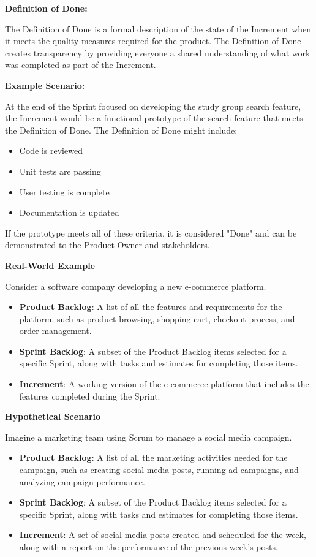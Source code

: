 \textbf{Definition of Done:}

The Definition of Done is a formal description of the state of the Increment
when it meets the quality measures required for the product. The Definition of
Done creates transparency by providing everyone a shared understanding of what
work was completed as part of the Increment.

\textbf{Example Scenario:}

At the end of the Sprint focused on developing the study group search feature,
the Increment would be a functional prototype of the search feature that meets
the Definition of Done. The Definition of Done might include:

\begin{itemize}
  \item Code is reviewed
  \item Unit tests are passing
  \item User testing is complete
  \item Documentation is updated
\end{itemize}

If the prototype meets all of these criteria, it is considered "Done" and can
be demonstrated to the Product Owner and stakeholders.

\textbf{Real-World Example}

Consider a software company developing a new e-commerce platform.

\begin{itemize}
  \item \textbf{Product Backlog}: A list of all the features and requirements for the platform, such as product browsing, shopping cart, checkout process, and order management.
  \item \textbf{Sprint Backlog}: A subset of the Product Backlog items selected for a specific Sprint, along with tasks and estimates for completing those items.
  \item \textbf{Increment}: A working version of the e-commerce platform that includes the features completed during the Sprint.
\end{itemize}

\textbf{Hypothetical Scenario}

Imagine a marketing team using Scrum to manage a social media campaign.

\begin{itemize}
  \item \textbf{Product Backlog}: A list of all the marketing activities needed for the campaign, such as creating social media posts, running ad campaigns, and analyzing campaign performance.
  \item \textbf{Sprint Backlog}: A subset of the Product Backlog items selected for a specific Sprint, along with tasks and estimates for completing those items.
  \item \textbf{Increment}: A set of social media posts created and scheduled for the week, along with a report on the performance of the previous week's posts.
\end{itemize}

